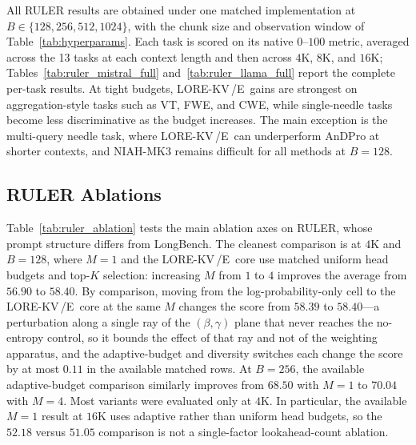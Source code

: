 \documentclass{article} %
\newcommand{\lorekvE}{LORE-KV\,/E}
\begin{document}
All RULER results are obtained under one matched implementation at
$B\in\{128,256,512,1024\}$, with the chunk size and observation
window of Table~\ref{tab:hyperparams}. Each task is scored on its native
$0$--$100$ metric,
averaged across the 13 tasks at each context length and then across
$4$K, $8$K, and $16$K; Tables~\ref{tab:ruler_mistral_full}
and~\ref{tab:ruler_llama_full} report the complete per-task results.
At tight budgets, \lorekvE\ gains are strongest on aggregation-style
tasks such as VT, FWE, and CWE, while single-needle tasks become less
discriminative as the budget increases. The main exception is the
multi-query needle task, where \lorekvE\ can underperform AnDPro at
shorter contexts, and NIAH-MK3 remains difficult for all methods at
$B{=}128$.


\subsection{RULER Ablations}
\label{app:ruler_ablation}

Table~\ref{tab:ruler_ablation} tests the main ablation axes on RULER,
whose prompt structure differs from LongBench. The cleanest comparison
is at $4$K and $B{=}128$, where $M{=}1$ and the \lorekvE\ core use
matched uniform head budgets and top-$K$ selection: increasing $M$
from $1$ to $4$ improves the average from $56.90$ to $58.40$. By
comparison, moving from the log-probability-only cell to the
\lorekvE\ core at the same $M$ changes the score from $58.39$ to
$58.40$---a perturbation along a single ray of the $(\beta,\gamma)$
plane that never reaches the no-entropy control, so it bounds the
effect of that ray and not of the weighting apparatus, and the
adaptive-budget and diversity switches each change the score by at
most $0.11$ in the available matched rows. At $B{=}256$, the
available adaptive-budget comparison similarly improves from $68.50$
with $M{=}1$ to $70.04$ with $M{=}4$. Most variants were evaluated
only at $4$K. In particular, the available $M{=}1$ result at $16$K
uses adaptive rather than uniform head budgets, so the $52.18$ versus
$51.05$ comparison is not a single-factor lookahead-count ablation.
\end{document}
